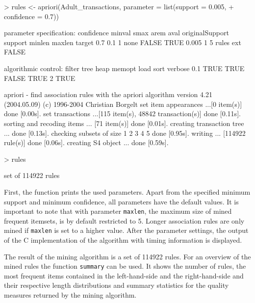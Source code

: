 \documentclass[10pt,a4paper]{article}
\newcommand{\code}[1]{\texttt{#1}}
\newcommand{\proglang}[1]{\textsf{#1}}
\begin{document}
\begin{Schunk}
\begin{Sinput}
> rules <- apriori(Adult_transactions, parameter = list(support = 0.005, 
+     confidence = 0.7))
\end{Sinput}
\begin{Soutput}
parameter specification:
 confidence minval smax arem  aval originalSupport support minlen maxlen target
        0.7    0.1    1 none FALSE            TRUE   0.005      1      5  rules
   ext
 FALSE

algorithmic control:
 filter tree heap memopt load sort verbose
    0.1 TRUE TRUE  FALSE TRUE    2    TRUE

apriori - find association rules with the apriori algorithm
version 4.21 (2004.05.09)        (c) 1996-2004   Christian Borgelt
set item appearances ...[0 item(s)] done [0.00s].
set transactions ...[115 item(s), 48842 transaction(s)] done [0.11s].
sorting and recoding items ... [71 item(s)] done [0.01s].
creating transaction tree ... done [0.13s].
checking subsets of size 1 2 3 4 5 done [0.95s].
writing ... [114922 rule(s)] done [0.06s].
creating S4 object  ... done [0.59s].
\end{Soutput}
\begin{Sinput}
> rules
\end{Sinput}
\begin{Soutput}
set of 114922 rules 
\end{Soutput}
\end{Schunk}

%

First, the function prints the used parameters.  Apart from the
specified minimum support and minimum confidence, all parameters have
the default values. It is important to note that with parameter
\code{maxlen}, the maximum size of mined frequent itemsets, is by
default restricted to 5.  Longer association rules are only mined if
\code{maxlen} is set to a higher value.  After the parameter settings,
the output of the \proglang{C} implementation of the algorithm with timing
information is displayed.

The result of the mining algorithm is a set of 114922
rules.  For an overview of the mined rules the function \code{summary}
can be used.  It shows the number of rules, the most frequent items
contained in the left-hand-side and the right-hand-side and their
respective length distributions and summary statistics for the quality
measures returned by the mining algorithm.
\end{document}
